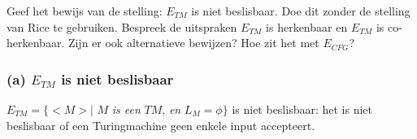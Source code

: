 \begin{question}
	Geef het bewijs van de stelling: $E_{TM}$ is niet beslisbaar. Doe dit zonder de stelling van Rice te gebruiken. Bespreek de uitspraken $E_{TM}$ is herkenbaar en $E_{TM}$ is co-herkenbaar. Zijn er ook alternatieve bewijzen? Hoe zit het met $E_{CFG}$?
\end{question}

\subsubsection{(a) $E_{TM}$ is niet beslisbaar}

\begin{theorem}[$E_{TM}$]
	$E_{TM} = \{<M>|$ $M$ \textit{is een} $TM$, \textit{en} $L_M = \phi \}$ is niet beslisbaar: het is niet beslisbaar of een Turingmachine geen enkele input accepteert.
\end{theorem}

